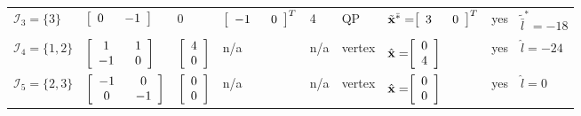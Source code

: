 \documentclass{imaman}
\newcommand{\bfx}{{\bf x}}
\newcommand{\calI}{{\mathcal I}}
\numberwithin{equation}{section}
\begin{document}
\begin{landscape}
\begin{table}[htbp]
\begin{threeparttable}[tbhp]
\begin{tabular}{l l l l l l l l l}
$\calI_3=\{3\}$ & \hspace{-0.07cm}$\left[ \renewcommand{\arraystretch}{1} \begin{array}{cc} 0~~ & -1 \end{array}\right]$ & 0 & \hspace{-0.1cm}$\left[ \renewcommand{\arraystretch}{1} \begin{array}{cc} -1~~ & 0 \end{array}\right]^T$ & 4 & QP & $\tilde\bfx^{\bar *}=\hspace{-0.1cm}\left[ \renewcommand{\arraystretch}{1} \begin{array}{cc} 3~~ & 0 \end{array}\right]^T$ & yes & $\tilde{\bar l}^*=-18$ \vspace{0.1cm} \\
$\calI_4=\{1,2\}$ & \hspace{-0.1cm}$\left[ \renewcommand{\arraystretch}{1} \begin{array}{cc} 1 & ~~1 \\ -1 & ~~0 \end{array}\right]$ & \hspace{-0.1cm}$\left[ \renewcommand{\arraystretch}{1} \begin{array}{c} 4 \\ 0 \end{array}\right]$ & \hspace{-0.05cm}n/a & n/a & vertex & $\hat\bfx=\hspace{-0.1cm}\left[ \renewcommand{\arraystretch}{1} \begin{array}{c} 0 \\ 4 \end{array}\right]$ & yes & $\hat l=-24$ \vspace{0.1cm} \vspace{0.1cm} \\
$\calI_5=\{2,3\}$ & \hspace{-0.1cm}$\left[ \renewcommand{\arraystretch}{1} \begin{array}{cc} -1 & ~~0 \\ 0 & ~~{-1} \end{array}\right]$ & \hspace{-0.1cm}$\left[ \renewcommand{\arraystretch}{1} \begin{array}{c} 0 \\ 0 \end{array}\right]$ & \hspace{-0.05cm}n/a & n/a & vertex & $\hat\bfx=\hspace{-0.1cm}\left[ \renewcommand{\arraystretch}{1} \begin{array}{c} 0 \\ 0 \end{array}\right]$ & yes & $\hat l=0$ \vspace{0.1cm} \vspace{0.1cm} \\

\end{tabular}
\end{threeparttable}
\end{table}
\end{landscape}
\end{document}
